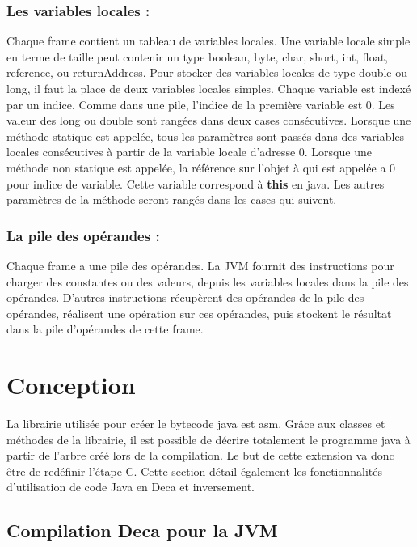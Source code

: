 \documentclass[12pt, a4paper, one side]{article}
\begin{document}
    \subsubsection{Les variables locales :}
    Chaque frame contient un tableau de variables locales. Une variable locale   simple en terme de taille peut contenir un type boolean, byte, char, short, int, float, reference, ou returnAddress. Pour stocker des variables locales de type double ou long, il faut la place de deux variables locales simples.
    Chaque variable est indexé par un indice. Comme dans une pile, l'indice de la première variable est 0. Les valeur des long ou double sont rangées dans deux cases consécutives.
    Lorsque une méthode statique est appelée, tous les paramètres sont passés dans des variables locales consécutives à partir de la variable locale d'adresse 0.
    Lorsque une méthode non statique est appelée, la référence sur l'objet à qui  est appelée a 0 pour indice de variable. Cette variable correspond à \textbf{this} en java. Les autres paramètres de la méthode seront rangés dans les cases qui suivent.

    \subsubsection{La pile des opérandes :} Chaque frame a une pile des opérandes. La JVM fournit des instructions pour charger des constantes ou des valeurs, depuis les variables locales dans la pile des opérandes. D'autres instructions récupèrent des opérandes de la pile des opérandes, réalisent une opération sur ces opérandes, puis stockent le résultat dans la pile d'opérandes de cette frame.

    \newpage
    \section{Conception}

    La librairie utilisée pour créer le bytecode java est asm. Grâce aux classes
    et méthodes de la librairie, il est possible de décrire totalement le programme
    java à partir de l'arbre créé lors de la compilation. Le but de cette extension
    va donc être de redéfinir l'étape C.
    Cette section détail également les fonctionnalités d'utilisation de code Java en Deca et inversement.

    \subsection{Compilation Deca pour la JVM}
\end{document}
